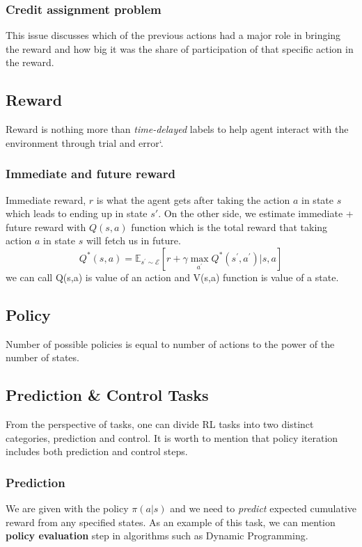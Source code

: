 \documentclass[letterpaper,12pt]{article}
\begin{document}
\subsubsection{Credit assignment problem}
This issue discusses which of the previous actions had a major role in bringing the reward and how big it was the share of participation of that specific action in the reward.

\subsection{Reward}
Reward is nothing more than \textit{time-delayed} labels to help agent interact with the environment through trial and error`. 
\subsubsection{Immediate and future reward}
Immediate reward, $r$ is what the agent gets after taking the action $a$ in state $s$ which leads to ending up in state $s'$. On the other side, we estimate immediate + future reward with $Q(s,a)$ function which is the total reward that taking action $a$ in state $s$ will fetch us in future.
\begin{equation}
    Q ^ { * } ( s , a ) = \mathbb { E } _ { s ^ { \prime } \sim \mathcal { E } } \left[ r + \gamma \max _ { a ^ { \prime } } Q ^ { * } \left( s ^ { \prime } , a ^ { \prime } \right) | s , a \right]
\end{equation}
we can call Q(s,a) is value of an action and V(s,a) function is value of a state. 

\subsection{Policy}
Number of possible policies is equal to number of actions to the power of the number of states.

\subsection{Prediction \& Control Tasks}
From the perspective of tasks, one can divide RL tasks into two distinct categories, prediction and control. It is worth to mention that policy iteration includes both prediction and control steps.

\subsubsection{Prediction}
We are given with the policy $\pi(a|s)$ and we need to \textit{predict} expected cumulative reward from any specified states. As an example of this task, we can mention \textbf{policy evaluation} step in algorithms such as Dynamic Programming.
\end{document}
